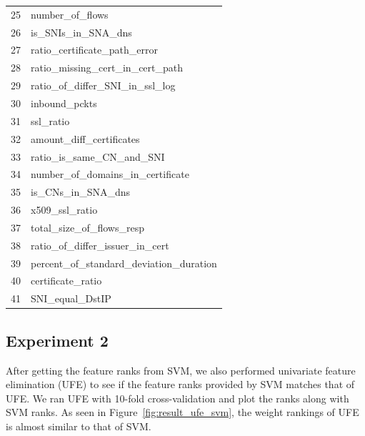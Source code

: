 \begin{table}[!htb]
\begin{center}
\begin{tabular}{c|p{}}
			 25 & number\_of\_flows                          \\
			 26 & is\_SNIs\_in\_SNA\_dns                     \\
			 27 & ratio\_certificate\_path\_error            \\
			 28 & ratio\_missing\_cert\_in\_cert\_path       \\
			 29 & ratio\_of\_differ\_SNI\_in\_ssl\_log       \\
			 30 & inbound\_pckts                             \\
			 31 & ssl\_ratio                                 \\
			 32 & amount\_diff\_certificates                 \\
			 33 & ratio\_is\_same\_CN\_and\_SNI              \\
			 34 & number\_of\_domains\_in\_certificate       \\
			 35 & is\_CNs\_in\_SNA\_dns                      \\
			 36 & x509\_ssl\_ratio                           \\
			 37 & total\_size\_of\_flows\_resp               \\
			 38 & ratio\_of\_differ\_issuer\_in\_cert        \\
			 39 & percent\_of\_standard\_deviation\_duration \\
			 40 & certificate\_ratio                         \\
			 41 & SNI\_equal\_DstIP                        \\ \hline
		\end{tabular}
	\end{center}
\end{table}

\clearpage

\subsection{Experiment 2}

After getting the feature ranks from SVM, we also performed univariate feature elimination (UFE) to see if the feature ranks provided by SVM matches that of UFE. We ran UFE with 10-fold cross-validation and plot the ranks along with SVM ranks. As seen in Figure~\ref{fig:result_ufe_svm}, the weight rankings of UFE is almost similar to that of SVM.

